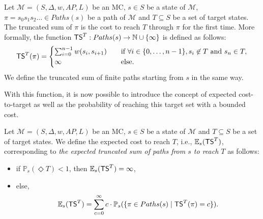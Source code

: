 \begin{definition}
  Let $\mathcal{M}=(S, \Delta, w, AP, L)$ be an MC, $s \in S$ be a state of $\mathcal{M}$, $\pi = s_0s_1s_2\dots \in Paths(s)$ be a path of $\mathcal{M}$ and $T \subseteq S$ be a set of target states.
  The truncated sum of $\pi$ is the cost to reach $T$ through $\pi$
  for the first time. More formally, the function $\text{\sffamily TS}^T: Paths(s) \rightarrow \mathbb{N} \cup \{\infty\}$ is defined as follows:
	\[
		\text{\sffamily TS}^T(\pi) =
		\begin{cases}
			\sum_{i = 0}^{n-1} w(s_i, s_{i+1}) & \quad \text{if } \forall i \in \{0, \dots, n - 1\}, s_i \not\in T \text{ and } s_n \in T, \\
			\infty & \quad \text{else.}
		\end{cases}
	\]
  We define the truncated sum of finite paths starting from $s$ in the same way.
\end{definition}
With this function, it is now possible to introduce the concept of
expected cost-to-target as well as
the probability of reaching this target set with a bounded cost.

\begin{definition}
	Let $\mathcal{M} = (S, \Delta, w, AP, L)$ be an MC, $s \in S$ be a state of $\mathcal{M}$ and $T \subseteq S$ be a set of target states. We define the expected cost to reach $T$, i.e., $\mathbb{E}_s(\text{\sffamily TS}^T)$, corresponding to \textit{the expected truncated sum of paths from $s$ to reach $T$} as follows:
	\begin{itemize}
	\renewcommand{\labelitemi}{\tiny$\bullet$}
	\item if $\mathbb{P}_s(\Diamond T) < 1$, then $\mathbb{E}_s(\text{\sffamily TS}^T) = \infty$,%
	\item else,
	\[
    \mathbb{E}_s(\text{\sffamily TS}^T) = \sum_{c = 0}^\infty c \cdot \mathbb{P}_s(\{\pi \in Paths(s) \; | \; \text{\sffamily TS}^T(\pi) = c \}).
  \]
	\end{itemize}
\end{definition}

